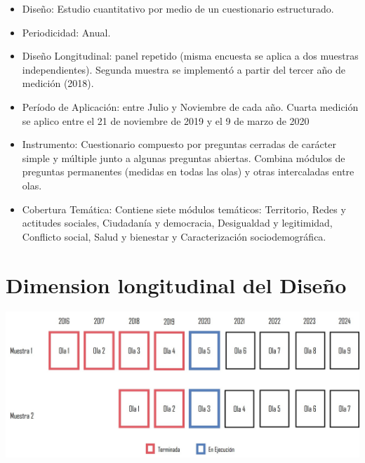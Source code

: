 \documentclass[
  12pt,
]{book}
\begin{document}
\begin{itemize}
\item
  Diseño: Estudio cuantitativo por medio de un cuestionario estructurado.
\item
  Periodicidad: Anual.
\item
  Diseño Longitudinal: panel repetido (misma encuesta se aplica a dos muestras independientes). Segunda muestra se implementó a partir del tercer año de medición (2018).
\item
  Período de Aplicación: entre Julio y Noviembre de cada año. Cuarta medición se aplico entre el 21 de noviembre de 2019 y el 9 de marzo de 2020
\item
  Instrumento: Cuestionario compuesto por preguntas cerradas de carácter simple y múltiple junto a algunas preguntas abiertas. Combina módulos de preguntas permanentes (medidas en todas las olas) y otras intercaladas entre olas.
\item
  Cobertura Temática: Contiene siete módulos temáticos: Territorio, Redes y actitudes sociales, Ciudadanía y democracia, Desigualdad y legitimidad, Conflicto social, Salud y bienestar y Caracterización sociodemográfica.
\end{itemize}

\hypertarget{dimension-longitudinal-del-diseuxf1o}{%
\section{Dimension longitudinal del Diseño}\label{dimension-longitudinal-del-diseuxf1o}}

\begin{center}\includegraphics[width=1.5\linewidth,height=1.5\textheight]{inputs/images/longitudinal} \end{center}
\end{document}
